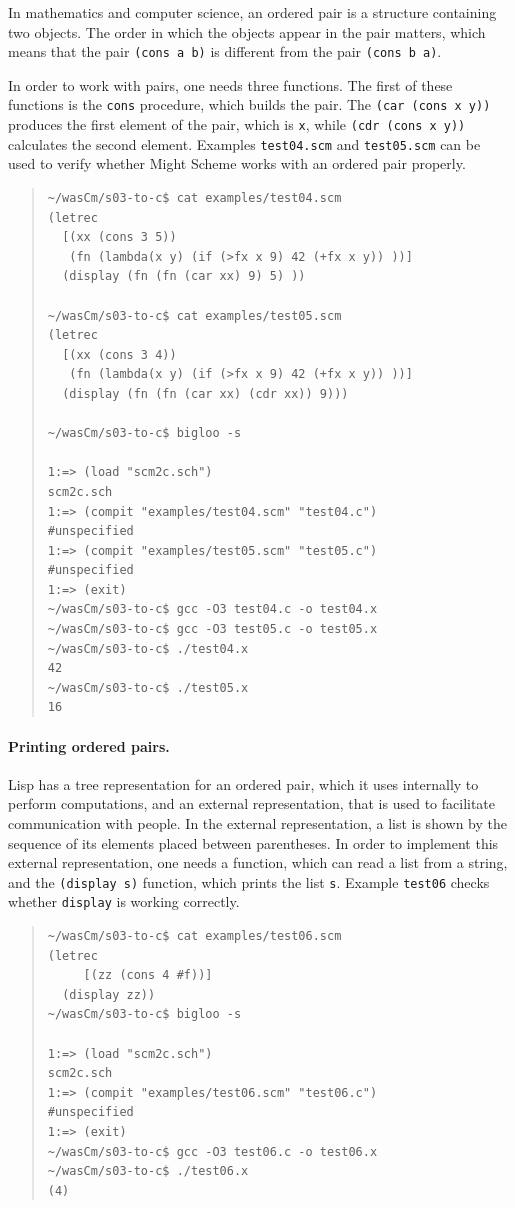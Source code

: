 \documentclass[a4paper,12pt]{book}
\begin{document}
In mathematics and computer science, an ordered
pair is a structure containing two objects.
The order in which the objects appear in the
pair matters, which means that the pair
\verb|(cons a b)| is different from the pair
\verb|(cons b a)|.

In order to work with pairs, one needs three functions.
The first of these functions is the \verb|cons| procedure,
which builds the pair. The \verb|(car (cons x y))|
produces the first element of the pair, which is \verb|x|,
while \verb|(cdr (cons x y))| calculates the second element.
Examples \verb|test04.scm| and \verb|test05.scm| can be
used to verify whether Might Scheme works with an ordered
pair properly.
\begin{quote}
\begin{verbatim}
~/wasCm/s03-to-c$ cat examples/test04.scm 
(letrec
  [(xx (cons 3 5))
   (fn (lambda(x y) (if (>fx x 9) 42 (+fx x y)) ))]
  (display (fn (fn (car xx) 9) 5) ))

~/wasCm/s03-to-c$ cat examples/test05.scm 
(letrec
  [(xx (cons 3 4))
   (fn (lambda(x y) (if (>fx x 9) 42 (+fx x y)) ))]
  (display (fn (fn (car xx) (cdr xx)) 9)))

~/wasCm/s03-to-c$ bigloo -s

1:=> (load "scm2c.sch")
scm2c.sch
1:=> (compit "examples/test04.scm" "test04.c")
#unspecified
1:=> (compit "examples/test05.scm" "test05.c")
#unspecified
1:=> (exit)
~/wasCm/s03-to-c$ gcc -O3 test04.c -o test04.x
~/wasCm/s03-to-c$ gcc -O3 test05.c -o test05.x
~/wasCm/s03-to-c$ ./test04.x 
42
~/wasCm/s03-to-c$ ./test05.x 
16
\end{verbatim}
\end{quote}

\paragraph{Printing ordered pairs.} Lisp has
a tree representation for an ordered pair,
which it uses internally to perform computations,
and an external representation, that is used to
facilitate  communication with people. In the external
representation, a list is shown by the sequence
of its elements placed between parentheses. In order
to implement this external representation, one
needs a function, which can read a list from a string,
and the \verb|(display s)| function, which prints
the list \verb|s|.  Example \verb|test06| checks
whether \verb|display| is working correctly.
\begin{quote}
\begin{verbatim}
~/wasCm/s03-to-c$ cat examples/test06.scm 
(letrec
     [(zz (cons 4 #f))]
  (display zz))
~/wasCm/s03-to-c$ bigloo -s

1:=> (load "scm2c.sch")
scm2c.sch
1:=> (compit "examples/test06.scm" "test06.c")
#unspecified
1:=> (exit)
~/wasCm/s03-to-c$ gcc -O3 test06.c -o test06.x
~/wasCm/s03-to-c$ ./test06.x 
(4)
\end{verbatim}
\end{quote}
\end{document}

